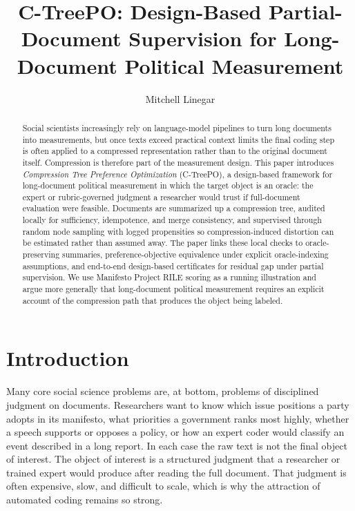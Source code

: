 \documentclass[11pt]{article}
\title{C-TreePO: Design-Based Partial-Document Supervision for Long-Document Political Measurement}
\author{Mitchell Linegar}
\date{}
\begin{document}
\maketitle

\begin{abstract}
Social scientists increasingly rely on language-model pipelines to turn long documents into measurements, but once texts exceed practical context limits the final coding step is often applied to a compressed representation rather than to the original document itself. Compression is therefore part of the measurement design. This paper introduces \emph{Compression Tree Preference Optimization} (C-TreePO), a design-based framework for long-document political measurement in which the target object is an oracle: the expert or rubric-governed judgment a researcher would trust if full-document evaluation were feasible. Documents are summarized up a compression tree, audited locally for sufficiency, idempotence, and merge consistency, and supervised through random node sampling with logged propensities so compression-induced distortion can be estimated rather than assumed away. The paper links these local checks to oracle-preserving summaries, preference-objective equivalence under explicit oracle-indexing assumptions, and end-to-end design-based certificates for residual gap under partial supervision. We use Manifesto Project RILE scoring as a running illustration and argue more generally that long-document political measurement requires an explicit account of the compression path that produces the object being labeled.
\end{abstract}

\section{Introduction}\label{sec:introduction}

Many core social science problems are, at bottom, problems of disciplined judgment on documents. Researchers want to know which issue positions a party adopts in its manifesto, what priorities a government ranks most highly, whether a speech supports or opposes a policy, or how an expert coder would classify an event described in a long report. In each case the raw text is not the final object of interest. The object of interest is a structured judgment that a researcher or trained expert would produce after reading the full document. That judgment is often expensive, slow, and difficult to scale, which is why the attraction of automated coding remains so strong.
\end{document}
